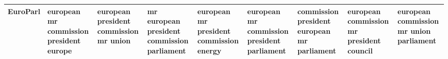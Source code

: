 \documentclass[11pt,a4paper]{article}
\begin{document}
\begin{appendices}
\begin{table}[htp]
\begin{tiny}
\begin{tabular}{|p{}|p{}|p{}|p{}|p{}|p{}|p{}|p{}|p{}|}
EuroParl & european \newline mr \newline commission \newline president \newline europe & european \newline president \newline commission \newline mr \newline union & mr \newline european \newline president \newline commission \newline parliament & european \newline mr \newline president \newline commission \newline energy & european \newline mr \newline commission \newline president \newline parliament & commission \newline president \newline european \newline mr \newline parliament & european \newline commission \newline mr \newline president \newline council & european \newline commission \newline mr \newline union \newline parliament\\\hline

\end{tabular}
\end{tiny}
\end{table}
\end{appendices}
\end{document}
